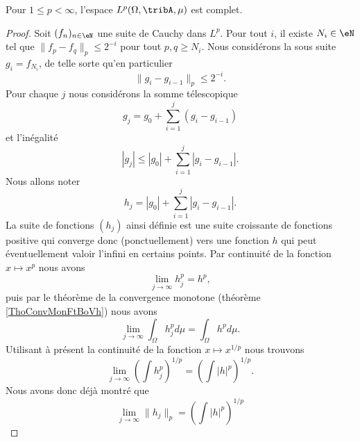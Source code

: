 \begin{theorem}
    Pour \( 1\leq p<\infty\), l'espace \( L^p(\Omega,\tribA,\mu)\) est complet.
\end{theorem}

\begin{proof}
    Soit \( (f_n)_{n\in\eN}\) une suite de Cauchy dans \( L^p\). Pour tout \( i\), il existe \( N_i\in\eN\) tel que $\| f_p-f_q \|_p\leq 2^{-i}$ pour tout \( p,q\geq N_i\). Nous considérons la sous suite \( g_i=f_{N_i}\), de telle sorte qu'en particulier
    \begin{equation}    \label{EqJLoDID}
        \|g_i-g_{i-1}\|_p\leq 2^{-i}.
    \end{equation}
    Pour chaque \( j\) nous considérons la somme télescopique
    \begin{equation}
        g_j=g_0+\sum_{i=1}^j(g_i-g_{i-1})
    \end{equation}
    et l'inégalité
    \begin{equation}
        | g_j |\leq | g_0 |+\sum_{i=1}^j| g_i-g_{i-1} |.
    \end{equation}
    Nous allons noter
    \begin{equation}        \label{EqSomPaFPQOWC}
        h_j=| g_0 |+\sum_{i=1}^j| g_i-g_{i-1} |.
    \end{equation}
    La suite de fonctions \( (h_j)\) ainsi définie est une suite croissante de fonctions positive qui converge donc (ponctuellement) vers une fonction \( h\) qui peut éventuellement valoir l'infini en certains points. Par continuité de la fonction \( x\mapsto x^p\) nous avons
    \begin{equation}
        \lim_{j\to \infty} h_j^p=h^p,
    \end{equation}
    puis par le théorème de la convergence monotone (théorème \ref{ThoConvMonFtBoVh}) nous avons
    \begin{equation}
        \lim_{j\to \infty} \int_{\Omega}h_j^pd\mu=\int_{\Omega}h^pd\mu.
    \end{equation}
    Utilisant à présent la continuité de la fonction \( x\mapsto x^{1/p}\) nous trouvons
    \begin{equation}
        \lim_{j\to \infty} \left( \int h_j^p \right)^{1/p}=\left( \int | h |^p \right)^{1/p}.
    \end{equation}
    Nous avons donc déjà montré que
    \begin{equation}
        \lim_{j\to \infty} \| h_j \|_p=\left( \int | h |^p \right)^{1/p}

\end{equation}
\end{proof}

